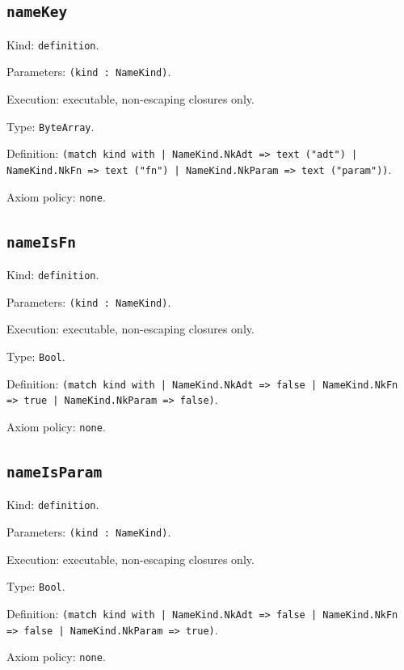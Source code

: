 \documentclass[11pt]{article}
\begin{document}
\subsection*{\texttt{nameKey}}
\noindent Kind: \texttt{definition}.\par
\noindent Parameters: \texttt{(kind : NameKind)}.\par
\noindent Execution: executable, non-escaping closures only.\par
\noindent Type: \texttt{ByteArray}.\par
\noindent Definition: \texttt{(match kind with | NameKind.NkAdt => text ("adt") | NameKind.NkFn => text ("fn") | NameKind.NkParam => text ("param"))}.\par
\noindent Axiom policy: \texttt{none}.\par
\subsection*{\texttt{nameIsFn}}
\noindent Kind: \texttt{definition}.\par
\noindent Parameters: \texttt{(kind : NameKind)}.\par
\noindent Execution: executable, non-escaping closures only.\par
\noindent Type: \texttt{Bool}.\par
\noindent Definition: \texttt{(match kind with | NameKind.NkAdt => false | NameKind.NkFn => true | NameKind.NkParam => false)}.\par
\noindent Axiom policy: \texttt{none}.\par
\subsection*{\texttt{nameIsParam}}
\noindent Kind: \texttt{definition}.\par
\noindent Parameters: \texttt{(kind : NameKind)}.\par
\noindent Execution: executable, non-escaping closures only.\par
\noindent Type: \texttt{Bool}.\par
\noindent Definition: \texttt{(match kind with | NameKind.NkAdt => false | NameKind.NkFn => false | NameKind.NkParam => true)}.\par
\noindent Axiom policy: \texttt{none}.\par
\end{document}
